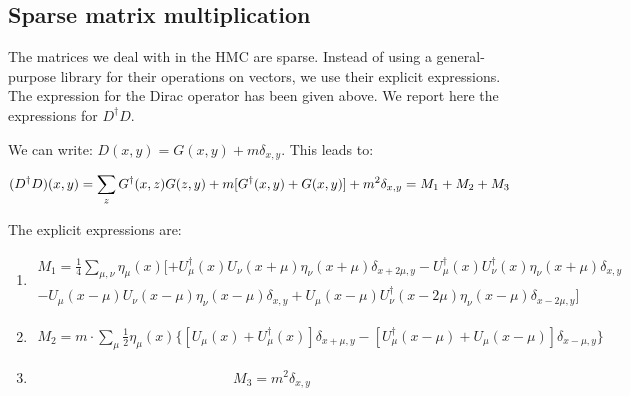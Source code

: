 \documentclass[12pt, a4paper]{article}
\begin{document}
  

\subsection{Sparse matrix multiplication}

The matrices we deal with in the HMC are sparse. Instead of using a general-purpose library for their operations on vectors, we use their explicit expressions. The expression for the Dirac operator has been given above. We report here the expressions for $D^{\dagger} D$.

We can write: $D(x,y) = G(x,y) + m \delta_{x,y}$. This leads to:

$$
(D^{\dagger} D) (x,y) = 
\sum_{z} G^{\dagger}(x,z) G(z,y)
+ m [ G^{\dagger}(x,y) + G(x,y) ]
+ m^2 \delta_{x,y} \\
= M_1 + M_2 + M_3
$$

The explicit expressions are:

\begin{enumerate}
\item
\begin{equation}
\begin{aligned}
  M_1 = 
  \frac{1}{4} \sum_{\mu, \nu} \eta_\mu(x)
  [ 
  + U_\mu^{\dagger}(x) U_\nu(x+\mu) 
  \eta_{\nu}(x+\mu) \delta_{x+2\mu, y}
  - U_{\mu}^{\dagger}(x) U_{\nu}^{\dagger}(x) 
  \eta_{\nu}(x+\mu) \delta_{x,y}
  \\
  - U_{\mu}(x-\mu) U_{\nu}(x-\mu) 
  \eta_{\nu}(x-\mu) \delta_{x,y}
  + U_{\mu}(x-\mu) U_{\nu}^{\dagger}(x-2\mu) 
  \eta_{\nu}(x-\mu) \delta_{x-2\mu,y}
  ]
\end{aligned}
\end{equation}

\item
\begin{equation}
\begin{aligned}
    M_2 = m \cdot \sum_{\mu} \frac{1}{2} \eta_{\mu}(x) 
    \{
      [ U_{\mu}(x) + U_{\mu}^{\dagger}(x) ] 
      \delta_{x+\mu, y} -
      [ U^{\dagger}_{\mu}(x-\mu) + U_{\mu}(x-\mu) ] 
      \delta_{x-\mu, y}
    \}  
\end{aligned}
\end{equation}

\item  
\begin{equation}
  M_3 = m^2 \delta_{x,y}
\end{equation}

\end{enumerate}
\end{document}
